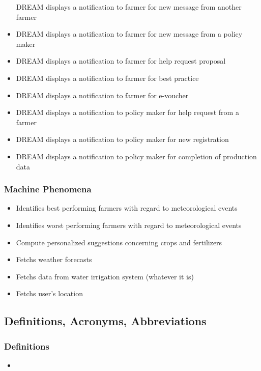 \begin{itemize}
	DREAM displays a notification to farmer for new message from another farmer
	\item
	DREAM displays a notification to farmer for new message from a policy maker
	\item
	DREAM displays a notification to farmer for help request proposal
	\item
	DREAM displays a notification to farmer for best practice
	\item
	DREAM displays a notification to farmer for e-voucher
	\item
	DREAM displays a notification to policy maker for help request from a farmer
	\item
	DREAM displays a notification to policy maker for new registration
	\item
	DREAM displays a notification to policy maker for completion of production data
	
\end{itemize}

\subsubsection{Machine Phenomena}
\begin{itemize}
	\item 
	Identifies best performing farmers with regard to meteorological events
	\item 
	Identifies worst performing farmers with regard to meteorological events
	\item 
	Compute personalized suggestions concerning crops and fertilizers
	\item 
	Fetchs weather forecasts
	\item 
	Fetchs data from water irrigation system (whatever it is)
	\item 
	Fetchs user's location
	
\end{itemize}

\subsection{Definitions, Acronyms, Abbreviations}
\subsubsection{Definitions}
\begin{itemize}
	\item 
\end{itemize}

